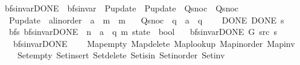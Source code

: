 \begin{isabellebody}
\isanewline
{}\isamarkupfalse%
\ bfs{\isacharunderscore}{\kern0pt}invar{\isacharunderscore}{\kern0pt}DONE\ {\isacharequal}{\kern0pt}\ bfs{\isacharunderscore}{\kern0pt}invar\ \ P{\isacharunderscore}{\kern0pt}update\ {\isacharequal}{\kern0pt}\ P{\isacharunderscore}{\kern0pt}update\ \ Q{\isacharunderscore}{\kern0pt}snoc\ {\isacharequal}{\kern0pt}\ Q{\isacharunderscore}{\kern0pt}snoc\ \isanewline
\ \ P{\isacharunderscore}{\kern0pt}update\ {\isacharcolon}{\kern0pt}{\isacharcolon}{\kern0pt}\ {\isachardoublequoteopen}{\isacharprime}{\kern0pt}a{\isacharcolon}{\kern0pt}{\isacharcolon}{\kern0pt}linorder\ {\isasymRightarrow}\ {\isacharprime}{\kern0pt}a\ {\isasymRightarrow}\ {\isacharprime}{\kern0pt}m\ {\isasymRightarrow}\ {\isacharprime}{\kern0pt}m{\isachardoublequoteclose}\ \isanewline
\ \ Q{\isacharunderscore}{\kern0pt}snoc\ {\isacharcolon}{\kern0pt}{\isacharcolon}{\kern0pt}\ {\isachardoublequoteopen}{\isacharprime}{\kern0pt}q\ {\isasymRightarrow}\ {\isacharprime}{\kern0pt}a\ {\isasymRightarrow}\ {\isacharprime}{\kern0pt}q{\isachardoublequoteclose}\ {\isacharplus}{\kern0pt}\isanewline
\ \ \ DONE{\isacharcolon}{\kern0pt}\ {\isachardoublequoteopen}DONE\ s{\isachardoublequoteclose}\isanewline
%
\isadeliminvisible
\isanewline
%
\endisadeliminvisible
%
\isataginvisible
{}\isamarkupfalse%
\ {\isacharparenleft}{\kern0pt}\ bfs{\isacharparenright}{\kern0pt}\ bfs{\isacharunderscore}{\kern0pt}invar{\isacharunderscore}{\kern0pt}DONE{\isacharprime}{\kern0pt}\ {\isacharcolon}{\kern0pt}{\isacharcolon}{\kern0pt}\ {\isachardoublequoteopen}{\isacharprime}{\kern0pt}n\ {\isasymRightarrow}\ {\isacharprime}{\kern0pt}a\ {\isasymRightarrow}\ {\isacharparenleft}{\kern0pt}{\isacharprime}{\kern0pt}q{\isacharcomma}{\kern0pt}\ {\isacharprime}{\kern0pt}m{\isacharparenright}{\kern0pt}\ state\ {\isasymRightarrow}\ bool{\isachardoublequoteclose}\ \isanewline
\ \ {\isachardoublequoteopen}bfs{\isacharunderscore}{\kern0pt}invar{\isacharunderscore}{\kern0pt}DONE{\isacharprime}{\kern0pt}\ G\ src\ s\ {\isasymequiv}\isanewline
\ \ \ bfs{\isacharunderscore}{\kern0pt}invar{\isacharunderscore}{\kern0pt}DONE\isanewline
\ \ \ \ Map{\isacharunderscore}{\kern0pt}empty\ Map{\isacharunderscore}{\kern0pt}delete\ Map{\isacharunderscore}{\kern0pt}lookup\ Map{\isacharunderscore}{\kern0pt}inorder\ Map{\isacharunderscore}{\kern0pt}inv\isanewline
\ \ \ \ Set{\isacharunderscore}{\kern0pt}empty\ Set{\isacharunderscore}{\kern0pt}insert\ Set{\isacharunderscore}{\kern0pt}delete\ Set{\isacharunderscore}{\kern0pt}isin\ Set{\isacharunderscore}{\kern0pt}inorder\ Set{\isacharunderscore}{\kern0pt}inv\isanewline

\end{isabellebody}
